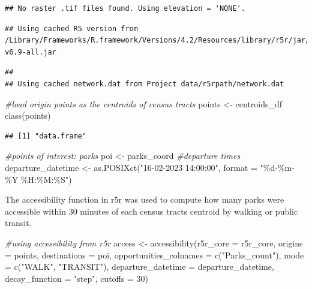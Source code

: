 \documentclass[
]{article}
\newenvironment{Shaded}{\begin{snugshade}}{\end{snugshade}}
\newcommand{\AttributeTok}[1]{\textcolor[rgb]{0.77,0.63,0.00}{#1}}
\newcommand{\CommentTok}[1]{\textcolor[rgb]{0.56,0.35,0.01}{\textit{#1}}}
\newcommand{\DecValTok}[1]{\textcolor[rgb]{0.00,0.00,0.81}{#1}}
\newcommand{\FunctionTok}[1]{\textcolor[rgb]{0.00,0.00,0.00}{#1}}
\newcommand{\NormalTok}[1]{#1}
\newcommand{\OtherTok}[1]{\textcolor[rgb]{0.56,0.35,0.01}{#1}}
\newcommand{\StringTok}[1]{\textcolor[rgb]{0.31,0.60,0.02}{#1}}
\begin{document}
\begin{verbatim}
## No raster .tif files found. Using elevation = 'NONE'.
\end{verbatim}

\begin{verbatim}
## Using cached R5 version from /Library/Frameworks/R.framework/Versions/4.2/Resources/library/r5r/jar/r5-v6.9-all.jar
\end{verbatim}

\begin{verbatim}
## 
## Using cached network.dat from Project data/r5rpath/network.dat
\end{verbatim}

\begin{Shaded}
\begin{Highlighting}[]
\CommentTok{\#load origin points as the centroids of census tracts}
\NormalTok{points }\OtherTok{\textless{}{-}}\NormalTok{ centroids\_df}
\FunctionTok{class}\NormalTok{(points)}
\end{Highlighting}
\end{Shaded}

\begin{verbatim}
## [1] "data.frame"
\end{verbatim}

\begin{Shaded}
\begin{Highlighting}[]
\CommentTok{\#points of interest: parks}
\NormalTok{poi }\OtherTok{\textless{}{-}}\NormalTok{ parks\_coord}
\CommentTok{\#departure times}
\NormalTok{departure\_datetime }\OtherTok{\textless{}{-}} \FunctionTok{as.POSIXct}\NormalTok{(}\StringTok{"16{-}02{-}2023 14:00:00"}\NormalTok{,}
                                 \AttributeTok{format =} \StringTok{"\%d{-}\%m{-}\%Y \%H:\%M:\%S"}\NormalTok{)}
\end{Highlighting}
\end{Shaded}

The accessibility function in r5r was used to compute how many parks
were accessible within 30 minutes of each census tracts centroid by
walking or public transit.

\begin{Shaded}
\begin{Highlighting}[]
\CommentTok{\#using accessibility from r5r}
\NormalTok{access }\OtherTok{\textless{}{-}} \FunctionTok{accessibility}\NormalTok{(}\AttributeTok{r5r\_core =}\NormalTok{ r5r\_core,}
                        \AttributeTok{origins =}\NormalTok{ points,}
                        \AttributeTok{destinations =}\NormalTok{ poi,}
                        \AttributeTok{opportunities\_colnames =} \FunctionTok{c}\NormalTok{(}\StringTok{"Parks\_count"}\NormalTok{),}
                        \AttributeTok{mode =} \FunctionTok{c}\NormalTok{(}\StringTok{"WALK"}\NormalTok{, }\StringTok{"TRANSIT"}\NormalTok{),}
                        \AttributeTok{departure\_datetime =}\NormalTok{ departure\_datetime,}
                        \AttributeTok{decay\_function =} \StringTok{"step"}\NormalTok{,}
                        \AttributeTok{cutoffs =} \DecValTok{30}\NormalTok{)}
\end{Highlighting}
\end{Shaded}
\end{document}
